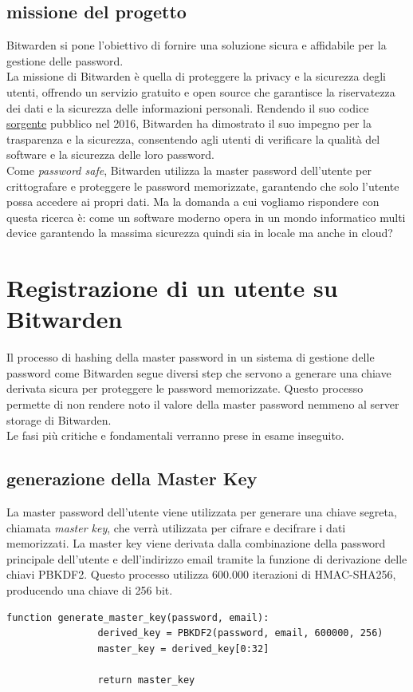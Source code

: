 \documentclass[a4paper,12pt]{report}
\begin{document}
		\section{missione del progetto}
		Bitwarden si pone l'obiettivo di fornire
		una soluzione sicura e affidabile per la gestione delle password.\\ La
		missione di Bitwarden è quella di proteggere la privacy e la sicurezza
		degli utenti, offrendo un servizio gratuito e open source che garantisce
		la riservatezza dei dati e la sicurezza delle informazioni personali.
		Rendendo il suo codice \href{https://github.com/bitwarden}{sorgente}
		pubblico nel 2016, Bitwarden ha dimostrato il suo impegno per la
		trasparenza e la sicurezza, consentendo agli utenti di verificare la
		qualità del software e la sicurezza delle loro password.\\
		
		Come \textit{password safe}, Bitwarden utilizza la master password
		dell'utente per crittografare e proteggere le password memorizzate,
		garantendo che solo l'utente possa accedere ai propri dati. Ma la domanda
		a cui vogliamo rispondere con questa ricerca è: come un software moderno
		opera in un mondo informatico multi device garantendo la massima sicurezza
		quindi sia in locale ma anche in cloud?
	\chapter{Registrazione di un utente su Bitwarden}

		Il processo di hashing della master password in un sistema di gestione
		delle password come Bitwarden segue diversi step che servono a generare 
		una chiave derivata sicura per proteggere le password memorizzate. Questo
		processo permette di non rendere noto il valore della master password
		nemmeno al server storage di Bitwarden.\cite{login-encryption}\\
		Le fasi più critiche e fondamentali verranno prese in esame inseguito.
		\section{generazione della Master Key}
		
		La master password dell'utente viene utilizzata per generare una chiave
		segreta, chiamata \textit{master key}, che verrà utilizzata per cifrare
		e decifrare i dati memorizzati. La master key viene derivata dalla
		combinazione della password principale dell'utente e dell'indirizzo
		email tramite la funzione di derivazione delle chiavi PBKDF2. Questo
		processo utilizza 600.000 iterazioni di HMAC-SHA256, producendo una
		chiave di 256 bit.\\
		\begin{lstlisting}[style=pseudocode]
			function generate_master_key(password, email):
				derived_key = PBKDF2(password, email, 600000, 256)
				master_key = derived_key[0:32]
				
				return master_key
		\end{lstlisting}
\end{document}
